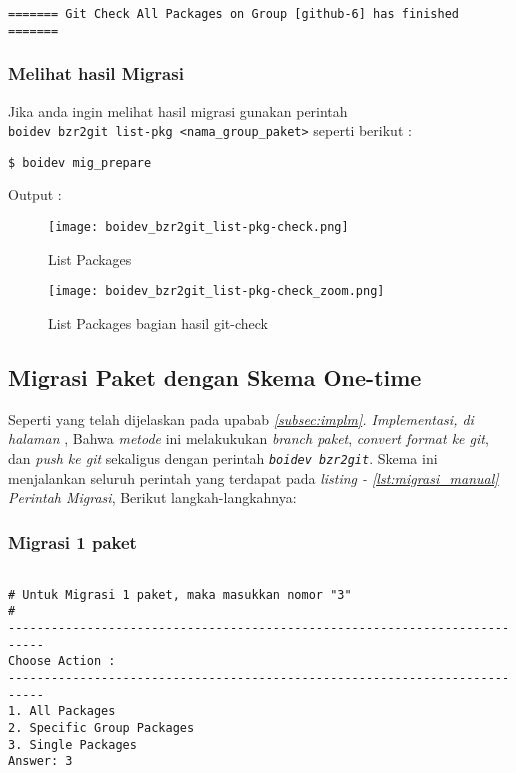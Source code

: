 {\begin{lstlisting}[language=ShellBash2]
======= Git Check All Packages on Group [github-6] has finished =======
\end{lstlisting}

\subsubsection{Melihat hasil Migrasi}
\noindent
Jika anda ingin melihat hasil migrasi gunakan perintah\\ {\small \texttt{boidev bzr2git list-pkg <nama\_group\_paket>}} seperti berikut :

\begin{lstlisting}[language=ShellBash]
$ boidev mig_prepare
\end{lstlisting}

\noindent
Output :

\begin{figure}[H]
	\centering
	\texttt{[image: boidev\_bzr2git\_list-pkg-check.png]}
	\caption{List Packages}
	\label{fig:bab2_list_pkg_check}
\end{figure}

\begin{figure}[H]
	\centering
	\texttt{[image: boidev\_bzr2git\_list-pkg-check\_zoom.png]}
	\caption{List Packages bagian hasil git-check}
	\label{fig:bab2_list_pkg_check_zoom}
\end{figure}

\subsection{Migrasi Paket dengan \textbf{Skema One-time}}
\label{implm_5}
\noindent 
Seperti yang telah dijelaskan pada upabab \textit{\ref{subsec:implm}. Implementasi, di halaman \pageref{itm:metode_one-time}}, Bahwa \textit{metode} ini melakukukan \textit{branch paket}, \textit{convert format ke git}, dan \textit{push ke git} sekaligus dengan perintah {\small \textit{\texttt{boidev bzr2git}}}. Skema ini menjalankan seluruh perintah yang terdapat pada \textit{listing - \ref{lst:migrasi_manual} Perintah Migrasi}, Berikut langkah-langkahnya:

\subsubsection{Migrasi 1 paket}

\begin{lstlisting}[language=ShellBash2]

# Untuk Migrasi 1 paket, maka masukkan nomor "3"
#
---------------------------------------------------------------------------
Choose Action : 
---------------------------------------------------------------------------
1. All Packages
2. Specific Group Packages
3. Single Packages
Answer: 3


\end{lstlisting}}
